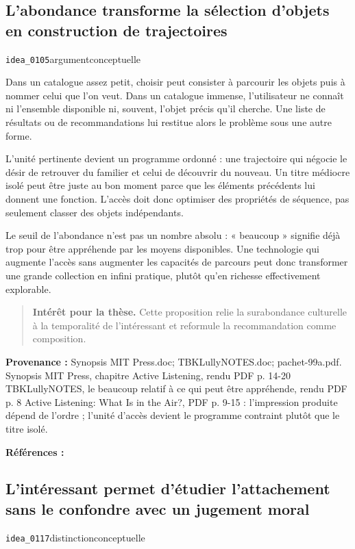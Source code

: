 \documentclass[10pt,a4paper]{article}
\begin{document}
\subsection{L'abondance transforme la sélection d'objets en construction de trajectoires}
{\small\color{metadata} \texttt{idea\_0105}\quad\textbullet\quad argument\quad\textbullet\quad conceptuelle\par}

Dans un catalogue assez petit, choisir peut consister à parcourir les objets puis à nommer celui que l'on veut. Dans un catalogue immense, l'utilisateur ne connaît ni l'ensemble disponible ni, souvent, l'objet précis qu'il cherche. Une liste de résultats ou de recommandations lui restitue alors le problème sous une autre forme.

L'unité pertinente devient un programme ordonné : une trajectoire qui négocie le désir de retrouver du familier et celui de découvrir du nouveau. Un titre médiocre isolé peut être juste au bon moment parce que les éléments précédents lui donnent une fonction. L'accès doit donc optimiser des propriétés de séquence, pas seulement classer des objets indépendants.

Le seuil de l'abondance n'est pas un nombre absolu : « beaucoup » signifie déjà trop pour être appréhende par les moyens disponibles. Une technologie qui augmente l'accès sans augmenter les capacités de parcours peut donc transformer une grande collection en infini pratique, plutôt qu'en richesse effectivement explorable.

\begin{quote}
\textbf{Intérêt pour la thèse.} Cette proposition relie la surabondance culturelle à la temporalité de l'intéressant et reformule la recommandation comme composition.
\end{quote}
{\footnotesize\color{metadata}\textbf{Provenance :} Synopsis MIT Press.doc; TBKLullyNOTES.doc; pachet-99a.pdf. Synopsis MIT Press, chapitre Active Listening, rendu PDF p. 14-20 TBKLullyNOTES, le beaucoup relatif à ce qui peut être appréhende, rendu PDF p. 8 Active Listening: What Is in the Air?, PDF p. 9-15 : l'impression produite dépend de l'ordre ; l'unité d'accès devient le programme contraint plutôt que le titre isolé.\par}
{\footnotesize\color{metadata}\textbf{Références :} \parencite{pachet1999active}\par}

\subsection{L'intéressant permet d'étudier l'attachement sans le confondre avec un jugement moral}
{\small\color{metadata} \texttt{idea\_0117}\quad\textbullet\quad distinction\quad\textbullet\quad conceptuelle\par}
\end{document}
